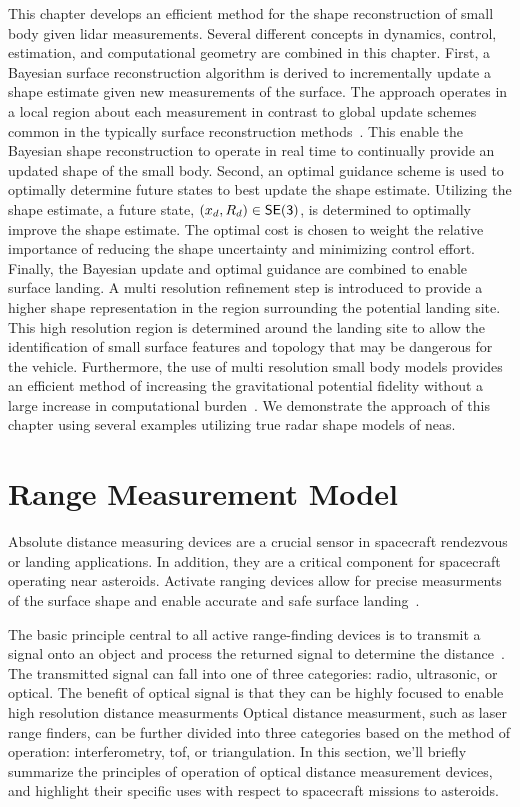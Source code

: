 This chapter develops an efficient method for the shape reconstruction of small body given \gls{lidar} measurements.
Several different concepts in dynamics, control, estimation, and computational geometry are combined in this chapter.
First, a Bayesian surface reconstruction algorithm is derived to incrementally update a shape estimate given new measurements of the surface.
The approach operates in a local region about each measurement in contrast to global update schemes common in the typically surface reconstruction methods~\cite{dey2006}.
This enable the Bayesian shape reconstruction to operate in real time to continually provide an updated shape of the small body.
Second, an optimal guidance scheme is used to optimally determine future states to best update the shape estimate. 
Utilizing the shape estimate, a future state, \( \left( x_d, R_d \right) \in \mathsf{SE(3)} \), is determined to optimally improve the shape estimate. 
The optimal cost is chosen to weight the relative importance of reducing the shape uncertainty and minimizing control effort.
Finally, the Bayesian update and optimal guidance are combined to enable surface landing.
A multi resolution refinement step is introduced to provide a higher shape representation in the region surrounding the potential landing site.
This high resolution region is determined around the landing site to allow the identification of small surface features and topology that may be dangerous for the vehicle. 
Furthermore, the use of multi resolution small body models provides an efficient method of increasing the gravitational potential fidelity without a large increase in computational burden~\cite{mcmahon2017}.
We demonstrate the approach of this chapter using several examples utilizing true radar shape models of \glspl{nea}.

\section{Range Measurement Model}

Absolute distance measuring devices are a crucial sensor in spacecraft rendezvous or landing applications.
In addition, they are a critical component for spacecraft operating near asteroids.
Activate ranging devices allow for precise measurments of the surface shape and enable accurate and safe surface landing~\cite{berry2013}.

The basic principle central to all active range-finding devices is to transmit a signal onto an object and process the returned signal to determine the distance~\cite{amann2001}.
The transmitted signal can fall into one of three categories: radio, ultrasonic, or optical.
The benefit of optical signal is that they can be highly focused to enable high resolution distance measurments
Optical distance measurment, such as laser range finders, can be further divided into three categories based on the method of operation: interferometry, \gls{tof}, or triangulation.
In this section, we'll briefly summarize the principles of operation of optical distance measurement devices, and highlight their specific uses with respect to spacecraft missions to asteroids.

